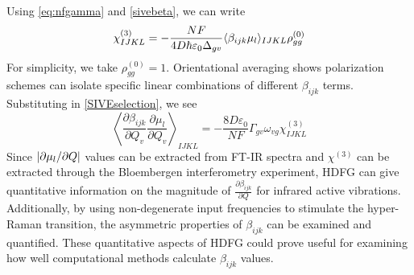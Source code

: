 \documentclass[aip, jcp, reprint, onecolumn, nofootinbib]{revtex4-2}
\begin{document}
Using \autoref{eq:nfgamma} and \autoref{sivebeta}, we can write
\begin{equation}\label{chi3}
		\chi^{(3)}_{IJKL} = -\frac{NF}{4D \hbar \varepsilon_0 \Delta_{gv}} \langle \beta_{ijk} \mu_l \rangle_{IJKL} \rho^{(0)}_{gg}\\
\end{equation}
For simplicity, we take $\rho^{(0)}_{gg} = 1$.
Orientational averaging shows polarization schemes can isolate specific linear combinations of different $\beta_{ijk}$ terms. \cite{Bersohn1966, Kauranen1996}
Substituting in \autoref{SIVEselection}, we see
\begin{equation}\label{betasive}
	\left\langle \frac{\partial \beta_{ijk}}{\partial Q_v} {\frac{\partial \mu_l}{\partial Q_v}} \right\rangle_{IJKL} = -\frac{8D \varepsilon_0}{NF}  {\Gamma_{gv} \omega_{vg}} \chi^{(3)}_{IJKL}
\end{equation}
Since $\abs{\partial \mu_l / \partial Q}$ values can be extracted from FT-IR spectra and $\chi^{(3)}$ can be extracted through the Bloembergen interferometry experiment,\cite{Levenson1974_1, Levenson1974_2, RN459} HDFG can give quantitative information on the magnitude of $\frac{\partial \beta_{ijk}}{\partial Q}$ for infrared active vibrations.
Additionally, by using non-degenerate input frequencies to stimulate the hyper-Raman transition, the asymmetric properties of $\beta_{ijk}$ can be examined and quantified. \cite{Denisov1986, Kozich2007}
These quantitative aspects of HDFG could prove useful for examining how well computational methods calculate $\beta_{ijk}$ values.
\end{document}

